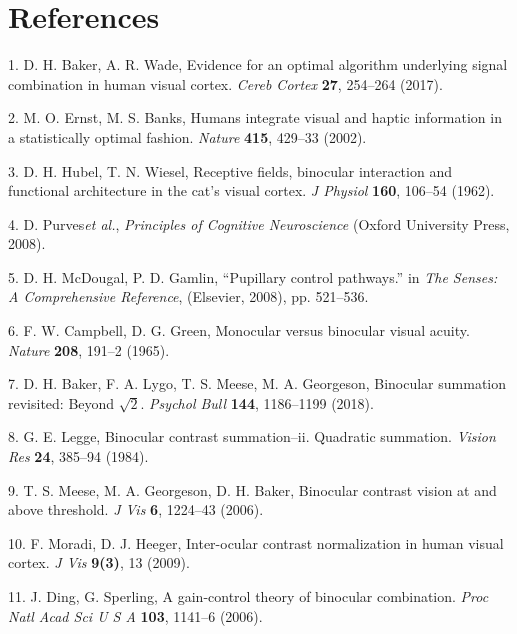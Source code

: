 \documentclass[
]{article}
\begin{document}
\hypertarget{references}{%
\section*{References}\label{references}}

\hypertarget{refs}{}
\leavevmode\hypertarget{ref-Baker2017}{}%
1. D. H. Baker, A. R. Wade, Evidence for an optimal algorithm underlying signal combination in human visual cortex. \emph{Cereb Cortex} \textbf{27}, 254--264 (2017).

\leavevmode\hypertarget{ref-Ernst2002}{}%
2. M. O. Ernst, M. S. Banks, Humans integrate visual and haptic information in a statistically optimal fashion. \emph{Nature} \textbf{415}, 429--33 (2002).

\leavevmode\hypertarget{ref-Hubel1962}{}%
3. D. H. Hubel, T. N. Wiesel, Receptive fields, binocular interaction and functional architecture in the cat's visual cortex. \emph{J Physiol} \textbf{160}, 106--54 (1962).

\leavevmode\hypertarget{ref-Purves2008}{}%
4. D. Purves\emph{et al.}, \emph{Principles of Cognitive Neuroscience} (Oxford University Press, 2008).

\leavevmode\hypertarget{ref-McDougal2008}{}%
5. D. H. McDougal, P. D. Gamlin, ``Pupillary control pathways.'' in \emph{The Senses: A Comprehensive Reference}, (Elsevier, 2008), pp. 521--536.

\leavevmode\hypertarget{ref-Campbell1965}{}%
6. F. W. Campbell, D. G. Green, Monocular versus binocular visual acuity. \emph{Nature} \textbf{208}, 191--2 (1965).

\leavevmode\hypertarget{ref-Baker2018}{}%
7. D. H. Baker, F. A. Lygo, T. S. Meese, M. A. Georgeson, Binocular summation revisited: Beyond \(\sqrt{2}\). \emph{Psychol Bull} \textbf{144}, 1186--1199 (2018).

\leavevmode\hypertarget{ref-Legge1984}{}%
8. G. E. Legge, Binocular contrast summation--ii. Quadratic summation. \emph{Vision Res} \textbf{24}, 385--94 (1984).

\leavevmode\hypertarget{ref-Meese2006}{}%
9. T. S. Meese, M. A. Georgeson, D. H. Baker, Binocular contrast vision at and above threshold. \emph{J Vis} \textbf{6}, 1224--43 (2006).

\leavevmode\hypertarget{ref-Moradi2009}{}%
10. F. Moradi, D. J. Heeger, Inter-ocular contrast normalization in human visual cortex. \emph{J Vis} \textbf{9(3)}, 13 (2009).

\leavevmode\hypertarget{ref-Ding2006}{}%
11. J. Ding, G. Sperling, A gain-control theory of binocular combination. \emph{Proc Natl Acad Sci U S A} \textbf{103}, 1141--6 (2006).
\end{document}
